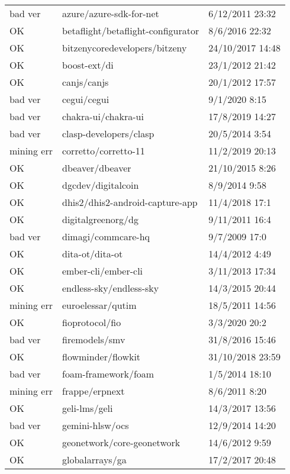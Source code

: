 \begin{appendices}
\begin{center}
\begin{longtable}{|l|l|l|}
            bad ver & azure/azure-sdk-for-net & 6/12/2011 23:32 \\
            OK & betaflight/betaflight-configurator & 8/6/2016 22:32 \\
            OK & bitzenycoredevelopers/bitzeny & 24/10/2017 14:48 \\
            OK & boost-ext/di & 23/1/2012 21:42 \\
            OK & canjs/canjs & 20/1/2012 17:57 \\
            bad ver & cegui/cegui & 9/1/2020 8:15 \\
            bad ver & chakra-ui/chakra-ui & 17/8/2019 14:27 \\
            bad ver & clasp-developers/clasp & 20/5/2014 3:54 \\
            mining err & corretto/corretto-11 & 11/2/2019 20:13 \\
            OK & dbeaver/dbeaver & 21/10/2015 8:26 \\
            OK & dgcdev/digitalcoin & 8/9/2014 9:58 \\
            OK & dhis2/dhis2-android-capture-app & 11/4/2018 17:1 \\
            OK & digitalgreenorg/dg & 9/11/2011 16:4 \\
            bad ver & dimagi/commcare-hq & 9/7/2009 17:0 \\
            OK & dita-ot/dita-ot & 14/4/2012 4:49 \\
            OK & ember-cli/ember-cli & 3/11/2013 17:34 \\
            OK & endless-sky/endless-sky & 14/3/2015 20:44 \\
            mining err & euroelessar/qutim & 18/5/2011 14:56 \\
            OK & fioprotocol/fio & 3/3/2020 20:2 \\
            bad ver & firemodels/smv & 31/8/2016 15:46 \\
            OK & flowminder/flowkit & 31/10/2018 23:59 \\
            bad ver & foam-framework/foam & 1/5/2014 18:10 \\
            mining err & frappe/erpnext & 8/6/2011 8:20 \\
            OK & geli-lms/geli & 14/3/2017 13:56 \\
            bad ver & gemini-hlsw/ocs & 12/9/2014 14:20 \\
            OK & geonetwork/core-geonetwork & 14/6/2012 9:59 \\
            OK & globalarrays/ga & 17/2/2017 20:48 \\

\end{longtable}
\end{center}
\end{appendices}

